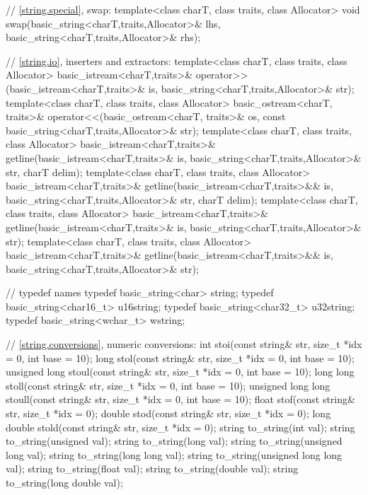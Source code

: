 \begin{codeblock}
{  // \ref{string.special}, swap:
  template<class charT, class traits, class Allocator>
    void swap(basic_string<charT,traits,Allocator>& lhs,
      basic_string<charT,traits,Allocator>& rhs);

  // \ref{string.io}, inserters and extractors:
  template<class charT, class traits, class Allocator>
    basic_istream<charT,traits>&
      operator>>(basic_istream<charT,traits>& is,
                 basic_string<charT,traits,Allocator>& str);
  template<class charT, class traits, class Allocator>
    basic_ostream<charT, traits>&
      operator<<(basic_ostream<charT, traits>& os,
                 const basic_string<charT,traits,Allocator>& str);
  template<class charT, class traits, class Allocator>
    basic_istream<charT,traits>&
      getline(basic_istream<charT,traits>& is,
              basic_string<charT,traits,Allocator>& str,
              charT delim);
  template<class charT, class traits, class Allocator>
    basic_istream<charT,traits>&
      getline(basic_istream<charT,traits>&& is,
              basic_string<charT,traits,Allocator>& str,
              charT delim);
  template<class charT, class traits, class Allocator>
    basic_istream<charT,traits>&
      getline(basic_istream<charT,traits>& is,
              basic_string<charT,traits,Allocator>& str);
  template<class charT, class traits, class Allocator>
    basic_istream<charT,traits>&
      getline(basic_istream<charT,traits>&& is,
              basic_string<charT,traits,Allocator>& str);

  //  typedef names
  typedef basic_string<char> string;
  typedef basic_string<char16_t> u16string;
  typedef basic_string<char32_t> u32string;
  typedef basic_string<wchar_t> wstring;

  // \ref{string.conversions}, numeric conversions:
  int stoi(const string& str, size_t *idx = 0, int base = 10);
  long stol(const string& str, size_t *idx = 0, int base = 10);
  unsigned long stoul(const string& str, size_t *idx = 0, int base = 10);
  long long stoll(const string& str, size_t *idx = 0, int base = 10);
  unsigned long long stoull(const string& str, size_t *idx = 0, int base = 10);
  float stof(const string& str, size_t *idx = 0);
  double stod(const string& str, size_t *idx = 0);
  long double stold(const string& str, size_t *idx = 0);
  string to_string(int val);
  string to_string(unsigned val);
  string to_string(long val);
  string to_string(unsigned long val);
  string to_string(long long val);
  string to_string(unsigned long long val);
  string to_string(float val);
  string to_string(double val);
  string to_string(long double val);

}
\end{codeblock}
